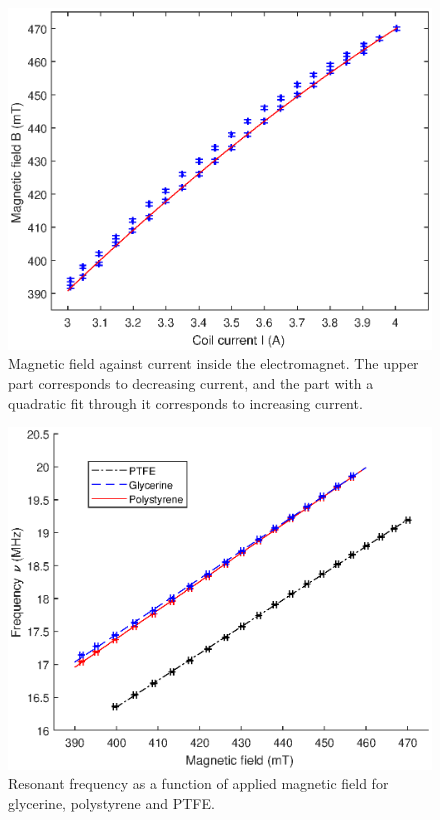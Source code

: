 \documentclass[a4paper]{jpconf}
\numberwithin{equation}{section}
\begin{document}
\begin{figure}[h!]
	\includegraphics[scale=0.67]{NMR_calibration_nocaption_nolegend_red.eps}
	\hspace{2pc}
	\begin{minipage}[b]{2.2in}
		\caption{Magnetic field against current inside the electromagnet. The upper part corresponds to decreasing current, and the part with a quadratic fit through it corresponds to increasing current.}
		\label{fig: hysteresis curve}
	\end{minipage}
\end{figure}
\begin{figure}[h!]
	\includegraphics[scale=0.67]{NMR_resonances.eps}
	\hspace{2pc}
	\begin{minipage}[b]{2.2in}
		\caption{Resonant frequency as a function of applied magnetic field for glycerine, polystyrene and PTFE.}
		\label{fig: NMR resonances}
	\end{minipage}
\end{figure}
\end{document}
